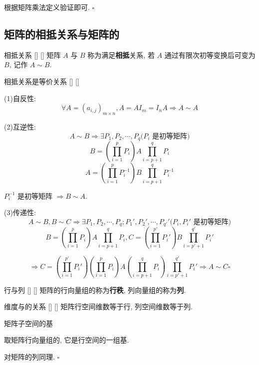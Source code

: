 \documentclass[UTF8]{ctexart}
\DeclareMathOperator{\0}{\mathbf{0}}
\DeclareMathOperator{\<}{\langle}
\renewcommand{\>}{\rangle}
\begin{document}
        \begin{prf}
			根据矩阵乘法定义验证即可.  \(\square\) 
	    \end{prf}
 
	\subsection{矩阵的相抵关系与矩阵的\秩}
	
		\begin{dfn}
			[]
			{相抵关系}
			[]
			[]
			矩阵 \(A\) 与 \(B\) 称为满足\textbf{相抵}关系, 若 \(A\) 通过有限次初等变换后可变为 \(B\), 记作 \(A\sim B\). 
		\end{dfn}
		
		\begin{ppt}
			[]
			{相抵关系是等价关系}
			[]
			[]
		\end{ppt}
  
		\begin{prf}
			(1)自反性: 
				\[\forall A=(a_{i,j})_{m\times n}, A=AI_m=I_nA\Longrightarrow A\sim A\]
			
			(2)互逆性: 
				\[A\sim B\Longrightarrow\exists P_1,P_2,\cdots, P_q\text{(\(P_i\) 是初等矩阵)}\]
				\[B=(\prod_{i=1}^{p}P_i)A\prod_{i=p+1}^qP_{i}\]
				\[A=(\prod_{i=1}^{p}P_i^{-1})B\prod_{i=p+1}^qP_{i}^{-1}\]
				
				 \(P_i^{-1}\) 是初等矩阵 \(\Longrightarrow B\sim A\). 
				
			(3)传递性: 
				\[A\sim B, B\sim C\Longrightarrow\exists P_1,P_2,\cdots,P_q;P_1',P_2',\cdots,P_{q'}'\textbf{(\(P_i,P_i'\) 是初等矩阵)}\] 
				\[B=(\prod_{i=1}^{p}P_i)A\prod_{i=p+1}^qP_{i}, C=(\prod_{i=1}^{p'}P_i')B\prod_{i=p'+1}^{q'}P_i'\]
				
				\[\Longrightarrow C=(\prod_{i=1}^{p'}P_i')(\prod_{i=1}^{p}P_i)A(
                \prod_{i=p+1}^qP_{i})\prod_{i=p'+1}^{q'}P_i'\Longrightarrow A\sim C\square\]
		\end{prf}
  
		\begin{dfn}
			[]
			{行\秩 与列\秩}
			[]
			[]
			矩阵的行向量组的\秩 称为\textbf{行秩}, 列向量组的\秩 称为\textbf{列\秩}. 
		\end{dfn}
		
		\begin{ppt}
			[]
			{维度与\秩 的关系}
			[]
			[]
			矩阵行空间维数等于行\秩, 列空间维数等于列\秩. 
		\end{ppt}
  
		\begin{prf}
			{}
			{矩阵子空间的基}
			{}
			{}

			取矩阵行向量组的, 它是行空间的一组基. 
			
			对矩阵的列同理.  \(\square\) 
		\end{prf}
  
\end{document}
